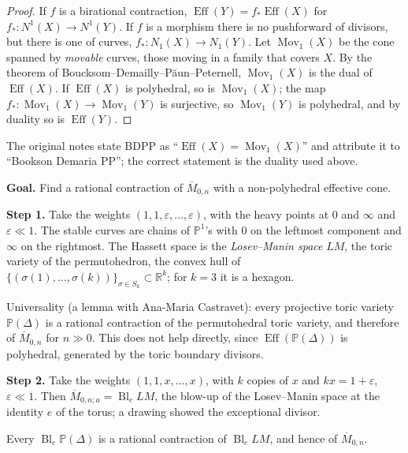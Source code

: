 \begin{proof}
If $f$ is a birational contraction,
$\operatorname{Eff}(Y)=
f_*\operatorname{Eff}(X)$ for
$f_*\colon N^1(X)\to N^1(Y)$. If $f$ is a
morphism there is no pushforward of
divisors, but there is one of curves,
$f_*\colon N_1(X)\to N_1(Y)$. Let
$\operatorname{Mov}_1(X)$ be the cone
spanned by \emph{movable} curves, those
moving in a family that covers $X$. By the
theorem of
Boucksom--Demailly--Păun--Peternell,
$\operatorname{Mov}_1(X)$ is the dual of
$\operatorname{Eff}(X)$. If
$\operatorname{Eff}(X)$ is polyhedral, so is
$\operatorname{Mov}_1(X)$; the map
$f_*\colon\operatorname{Mov}_1(X)\to
\operatorname{Mov}_1(Y)$ is surjective, so
$\operatorname{Mov}_1(Y)$ is polyhedral, and
by duality so is $\operatorname{Eff}(Y)$.
\end{proof}

The original notes state BDPP as
``$\operatorname{Eff}(X)=
\operatorname{Mov}_1(X)$'' and attribute it
to ``Bookson Demaria PP''; the correct
statement is the duality used above.

\medskip\noindent
{\bf Goal.} Find a rational contraction of
$\overline{M}_{0,n}$ with a non-polyhedral
effective cone.

\medskip\noindent
{\bf Step 1.} Take the weights
$(1,1,\varepsilon,\ldots,\varepsilon)$, with
the heavy points at $0$ and $\infty$ and
$\varepsilon\ll 1$. The stable curves are
chains of $\mathbb{P}^1$'s with $0$ on the
leftmost component and $\infty$ on the
rightmost. The Hassett space is the
\emph{Losev--Manin space} $LM$, the toric
variety of the permutohedron, the convex
hull of
$\{(\sigma(1),\ldots,\sigma(k))\}_{\sigma\in
S_k}\subset\mathbb{R}^k$; for $k=3$ it is a
hexagon.

Universality (a lemma with Ana-Maria
Castravet): every projective toric variety
$\mathbb{P}(\Delta)$ is a rational
contraction of the permutohedral toric
variety, and therefore of
$\overline{M}_{0,n}$ for $n\gg 0$. This does
not help directly, since
$\operatorname{Eff}(\mathbb{P}(\Delta))$ is
polyhedral, generated by the toric boundary
divisors.

\medskip\noindent
{\bf Step 2.} Take the weights
$(1,1,x,\ldots,x)$, with $k$ copies of $x$
and $kx=1+\varepsilon$, $\varepsilon\ll 1$.
Then $\overline{M}_{0,n;a}=
\operatorname{Bl}_e LM$, the blow-up of the
Losev--Manin space at the identity $e$ of
the torus; a drawing showed the exceptional
divisor.

\begin{theorem}
\label{theorem-tevelev-universality}
Every $\operatorname{Bl}_e\mathbb{P}(\Delta)$
is a rational contraction of
$\operatorname{Bl}_e LM$, and hence of
$\overline{M}_{0,n}$.
\end{theorem}

